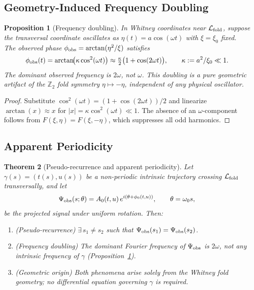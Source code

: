 \documentclass[12pt]{article}
\newtheorem{theorem}{Theorem}[section]
\newtheorem{proposition}[theorem]{Proposition}
\begin{document}
\subsection{Geometry-Induced Frequency Doubling}
\label{ssec:freq}

\begin{proposition}[Frequency doubling]
\label{prop:freqdouble}
In Whitney coordinates near $\mathcal{L}_{\rm fold}$, suppose the
transversal coordinate oscillates as $\eta(t)=a\cos(\omega t)$
with $\xi=\xi_0$ fixed.
The observed phase $\phi_{\rm obs}=\arctan(\eta^2/\xi)$ satisfies
\begin{equation}
  \phi_{\rm obs}(t)
  = \arctan\!\bigl(\kappa\cos^2(\omega t)\bigr)
  \approx \tfrac{\kappa}{2}\bigl(1+\cos(2\omega t)\bigr),
  \qquad \kappa := a^2/\xi_0 \ll 1.
  \label{eq:freqdouble}
\end{equation}
The dominant observed frequency is $2\omega$, not $\omega$.
This doubling is a pure geometric artifact of the $\mathbb{Z}_2$
fold symmetry $\eta\mapsto-\eta$, independent of any physical oscillator.
\end{proposition}

\begin{proof}
Substitute $\cos^2(\omega t)=(1+\cos(2\omega t))/2$ and linearize
$\arctan(x)\approx x$ for $|x|=\kappa\cos^2(\omega t)\ll1$.
The absence of an $\omega$-component follows from
$F(\xi,\eta)=F(\xi,-\eta)$, which suppresses all odd harmonics.
\end{proof}

\subsection{Apparent Periodicity}
\label{ssec:period}

\begin{theorem}[Pseudo-recurrence and apparent periodicity]
\label{thm:period}
Let $\gamma(s)=(t(s),u(s))$ be a non-periodic intrinsic trajectory
crossing $\mathcal{L}_{\rm fold}$ transversally, and let
\[
  \Psi_{\rm obs}(s;\theta) = A_0(t,u)\,e^{i(\theta+\phi_0(t,u))},
  \qquad \theta=\omega_0 s,
\]
be the projected signal under uniform rotation.
Then:
\begin{enumerate}
\item \textup{(Pseudo-recurrence)}
  $\exists\,s_1\ne s_2$ such that
  $\Psi_{\rm obs}(s_1)=\Psi_{\rm obs}(s_2)$.
\item \textup{(Frequency doubling)}
  The dominant Fourier frequency of $\Psi_{\rm obs}$ is $2\omega$,
  not any intrinsic frequency of $\gamma$
  \textup{(Proposition~\ref{prop:freqdouble})}.
\item \textup{(Geometric origin)}
  Both phenomena arise solely from the Whitney fold geometry; no
  differential equation governing $\gamma$ is required.
\end{enumerate}
\end{theorem}
\end{document}
